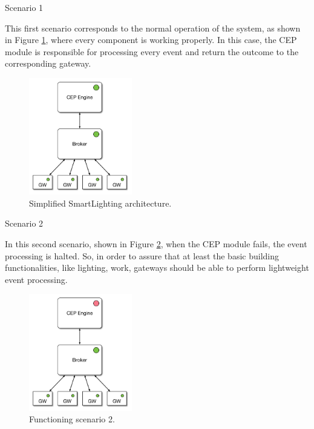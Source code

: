 \begin{Paragraph}{Scenario 1}
	
	This first scenario corresponds to the normal operation of the system, as shown in Figure \ref{fig:sc1}, where every component is working properly. In this case, the CEP module is responsible for processing every event and return the outcome to the corresponding gateway.
	 
	 \begin{figure}[H]
	 	\centering
	 	\includegraphics[width=0.4\textwidth]{figures/sc1.png}
	 	\caption{Simplified SmartLighting architecture. }
	 	\label{fig:sc1}
	 \end{figure}
	 
\end{Paragraph}

\begin{Paragraph}{Scenario 2}
	
	In this second scenario, shown in Figure \ref{fig:sc2}, when the CEP module fails, the event processing is halted. So, in order to assure that at least the basic building functionalities, like lighting, work, gateways should be able to perform lightweight event processing.
	
	\begin{figure}[H]
		\centering
		\includegraphics[width=0.4\textwidth]{figures/sc2.png}
		\caption{Functioning scenario 2.}
		\label{fig:sc2}
	\end{figure}
	
\end{Paragraph}

